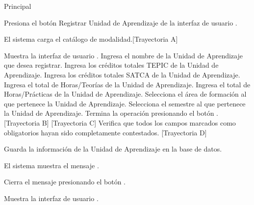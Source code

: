 \begin{UCtrayectoria}{Principal}

    \UCpaso[\UCactor] Presiona el botón Registrar Unidad de Aprendizaje de la interfaz de usuario .

    \UCpaso El sistema carga el catálogo de modalidad.[Trayectoria A]


    \UCpaso Muestra la interfaz de usuario .
    \UCpaso[\UCactor] Ingresa el nombre de la Unidad de Aprendizaje que desea registrar.
    \UCpaso[\UCactor] Ingresa los créditos totales TEPIC de la Unidad de Aprendizaje.
    \UCpaso[\UCactor] Ingresa los créditos totales SATCA de la Unidad de Aprendizaje.
    \UCpaso[\UCactor] Ingresa el total de Horas/Teorías de la Unidad de Aprendizaje.
    \UCpaso[\UCactor] Ingresa el total de Horas/Prácticas de la Unidad de Aprendizaje.
    \UCpaso[\UCactor] Selecciona el área de formación al que pertenece la Unidad de Aprendizaje.
    \UCpaso[\UCactor] Selecciona el semestre al que pertenece la Unidad de Aprendizaje.
    \UCpaso[\UCactor] Termina la operación presionando el botón . [Trayectoria B] [Trayectoria C]
    \UCpaso Verifica que todos los campos marcados como obligatorios hayan sido completamente contestados. [Trayectoria D]

    \UCpaso Guarda la información de la Unidad de Aprendizaje en la base de datos.

    \UCpaso El sistema muestra el mensaje .

    \UCpaso[\UCactor] Cierra el mensaje presionando el botón .

    \UCpaso Muestra la interfaz de usuario .
\end{UCtrayectoria}


\begin{comment}
\begin{UCtrayectoriaA}{A}{El sistema no encuentra ningún formulario para mostrar.}
	\UCpaso No encuentra ningún formulario para mostrar.
    \UCpaso El sistema muestra el mensaje \MSGref{MSG6}{Por el momento no se puede registrar la bibliografía}.
    \UCpaso[\UCactor] Cierra el mensaje presionando el botón \IUbutton{Aceptar}.
    \UCpaso Continua en el paso 1 de la trayectoria principal del \UCref{CU1}.
\end{UCtrayectoriaA}
\end{comment}

